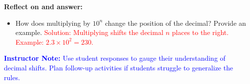 \documentclass[12pt]{article}
\begin{document}
\begin{tcolorbox}[colframe=black!60, colback=white,
coltitle=black, colbacktitle=black!15, fonttitle=\bfseries\Large,
title=Exit Ticket, halign title=center, left=10pt, right=10pt, top=10pt, bottom=15pt]
\textbf{Reflect on and answer:}
\begin{itemize}
    \item How does multiplying by \(10^n\) change the position of the decimal? Provide an example. \textcolor{red}{Solution: Multiplying shifts the decimal \(n\) places to the right. Example: \(2.3 \times 10^2 = 230\).}
\end{itemize}

\textcolor{blue}{\textbf{Instructor Note:} Use student responses to gauge their understanding of decimal shifts. Plan follow-up activities if students struggle to generalize the rules.}
\end{tcolorbox}
\end{document}
